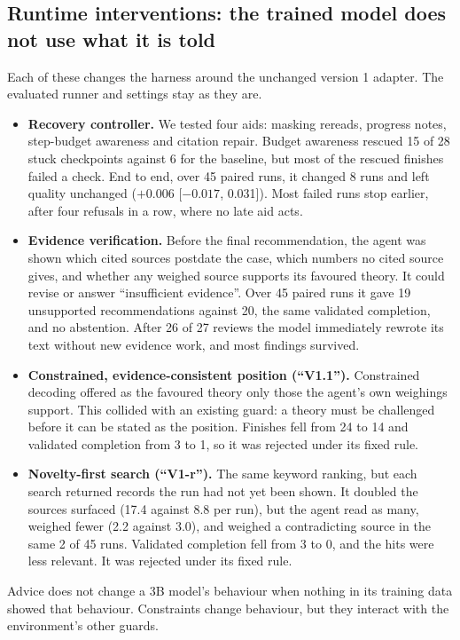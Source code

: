 \subsection{Runtime interventions: the trained model does not use what it is told}
Each of these changes the harness around the unchanged version 1 adapter. The evaluated runner and settings stay as
they are.
\begin{itemize}
  \item \textbf{Recovery controller.} We tested four aids: masking rereads, progress notes, step-budget awareness and
        citation repair. Budget awareness rescued 15 of 28 stuck checkpoints against 6 for the baseline, but most of
        the rescued finishes failed a check. End to end, over 45 paired runs, it changed 8 runs and left quality
        unchanged ($+0.006$ [$-0.017$, 0.031]). Most failed runs stop earlier, after four refusals in a row, where no
        late aid acts.
  \item \textbf{Evidence verification.} Before the final recommendation, the agent was shown which cited sources
        postdate the case, which numbers no cited source gives, and whether any weighed source supports its favoured
        theory. It could revise or answer ``insufficient evidence''. Over 45 paired runs it gave 19 unsupported
        recommendations against 20, the same validated completion, and no abstention. After 26 of 27 reviews the model
        immediately rewrote its text without new evidence work, and most findings survived.
  \item \textbf{Constrained, evidence-consistent position (``V1.1'').} Constrained decoding offered as the favoured
        theory only those the agent's own weighings support. This collided with an existing guard: a theory must be
        challenged before it can be stated as the position. Finishes fell from 24 to 14 and validated completion from
        3 to 1, so it was rejected under its fixed rule.
  \item \textbf{Novelty-first search (``V1-r'').} The same keyword ranking, but each search returned records the run had
        not yet been shown. It doubled the sources surfaced (17.4 against 8.8 per run), but the agent read as many,
        weighed fewer (2.2 against 3.0), and weighed a contradicting source in the same 2 of 45 runs. Validated
        completion fell from 3 to 0, and the hits were less relevant. It was rejected under its fixed rule.
\end{itemize}
Advice does not change a 3B model's behaviour when nothing in its training data showed that behaviour. Constraints
change behaviour, but they interact with the environment's other guards.

